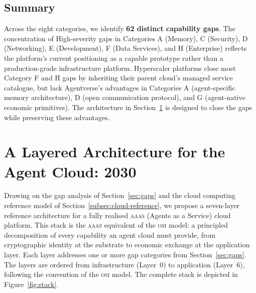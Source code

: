 \documentclass[twoside,11pt]{article}
\begin{document}
\subsection{Summary}
\label{subsec:gap-summary}

Across the eight categories, we identify \textbf{62 distinct capability gaps}.
The concentration of High-severity gaps in Categories A (Memory), C (Security),
D (Networking), E (Development), F (Data Services), and H (Enterprise) reflects
the platform's current positioning as a capable prototype rather than a
production-grade infrastructure platform.  Hyperscaler platforms close most
Category F and H gaps by inheriting their parent cloud's managed service
catalogue, but lack Agentverse's advantages in Categories A (agent-specific
memory architecture), D (open communication protocol), and G (agent-native
economic primitives).  The architecture in Section~\ref{sec:architecture} is
designed to close the gaps while preserving these advantages.

\section{A Layered Architecture for the Agent Cloud: 2030}
\label{sec:architecture}

Drawing on the gap analysis of Section~\ref{sec:gaps} and the cloud computing
reference model of Section~\ref{subsec:cloud-reference}, we propose a
seven-layer reference architecture for a fully realised \textsc{aaas} (Agents
as a Service) cloud platform.  This stack is the \textsc{aaas} equivalent of
the \textsc{osi} model: a principled decomposition of every capability an
agent cloud must provide, from cryptographic identity at the substrate to
economic exchange at the application layer.  Each layer addresses one or more
gap categories from Section~\ref{sec:gaps}.  The layers are ordered from
infrastructure (Layer~0) to application (Layer~6), following the convention
of the \textsc{osi} model.  The complete stack is depicted in
Figure~\ref{fig:stack}.
\end{document}

